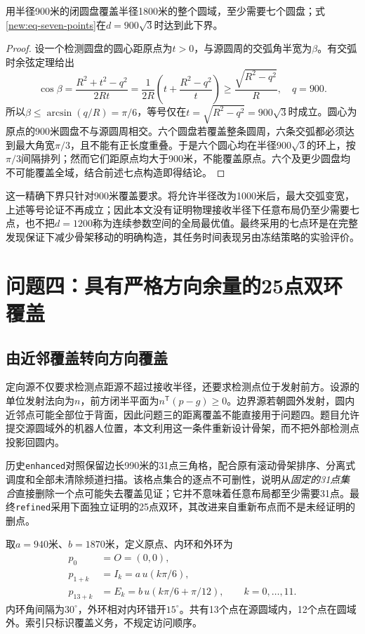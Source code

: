 \begin{theorem}[900米覆盖要求下至少需要七点]\label{new:thm-seven-lower}
用半径900米的闭圆盘覆盖半径1800米的整个圆域，至少需要七个圆盘；式\eqref{new:eq-seven-points}在$d=900\sqrt3$时达到此下界。
\end{theorem}
\begin{proof}
设一个检测圆盘的圆心距原点为$t>0$，与源圆周的交弧角半宽为$\beta$。有交弧时余弦定理给出
\[
\cos\beta=\frac{R^2+t^2-q^2}{2Rt}
=\frac1{2R}\left(t+\frac{R^2-q^2}{t}\right)
\ge\frac{\sqrt{R^2-q^2}}R,
\quad q=900.
\]
所以$\beta\le\arcsin(q/R)=\pi/6$，等号仅在$t=\sqrt{R^2-q^2}=900\sqrt3$时成立。圆心为原点的900米圆盘不与源圆周相交。六个圆盘若覆盖整条圆周，六条交弧都必须达到最大角宽$\pi/3$，且不能有正长度重叠。于是六个圆心均在半径$900\sqrt3$的环上，按$\pi/3$间隔排列；然而它们距原点均大于900米，不能覆盖原点。六个及更少圆盘均不可能覆盖全域，结合前述七点构造即得结论。
\end{proof}
这一精确下界只针对900米覆盖要求。将允许半径改为1000米后，最大交弧变宽，上述等号论证不再成立；因此本文没有证明物理接收半径下任意布局仍至少需要七点，也不把$d=1200$称为连续参数空间的全局最优值。最终采用的七点环是在完整发现保证下减少骨架移动的明确构造，其任务时间表现另由冻结策略的实验评价。

\section{问题四：具有严格方向余量的25点双环覆盖}
\label{new:sec-q4}
\subsection{由近邻覆盖转向方向覆盖}
定向源不仅要求检测点距源不超过接收半径，还要求检测点位于发射前方。设源的单位发射法向为$n$，前方闭半平面为$n^{\mathsf T}(p-g)\ge0$。边界源若朝圆外发射，圆内近邻点可能全部位于背面，因此问题三的距离覆盖不能直接用于问题四。题目允许提交源圆域外的机器人位置，本文利用这一条件重新设计骨架，而不把外部检测点投影回圆内。

历史\texttt{enhanced}对照保留边长990米的31点三角格，配合原有滚动骨架排序、分离式调度和全部未清除频道扫描。该格点集合的逐点不可删性，说明从\emph{固定的31点集合}直接删除一个点可能失去覆盖见证；它并不意味着任意布局都至少需要31点。最终\texttt{refined}采用下面独立证明的25点双环，其改进来自重新布点而不是未经证明的删点。

取$a=940$米、$b=1870$米，定义原点、内环和外环为
\begin{equation}\label{new:eq-polar-points}
\begin{aligned}
p_0&=O=(0,0),\\
p_{1+k}&=I_k=a\,u(k\pi/6),\\
p_{13+k}&=E_k=b\,u(k\pi/6+\pi/12),\qquad k=0,\ldots,11.
\end{aligned}
\end{equation}
内环角间隔为$30^\circ$，外环相对内环错开$15^\circ$。共有13个点在源圆域内，12个点在圆域外。索引只标识覆盖义务，不规定访问顺序。

